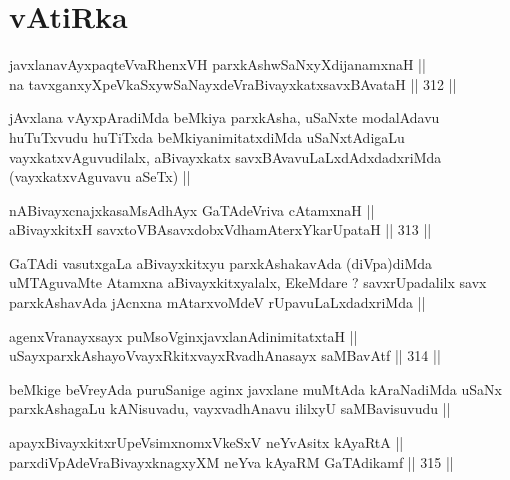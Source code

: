 \section*{vAtiRka}

\begin{shl}
javxlanavAyxpaqteVvaRhenxVH parxkAshwSaNxyXdijanamxnaH || \\
na tavxganxyXpeVkaSxywSaNayxdeVraBivayxkatxsavxBAvataH ||  312 ||  
\end{shl}

\begin{artha}
jAvxlana vAyxpAradiMda beMkiya parxkAsha, uSaNxte modalAdavu
huTuTxvudu huTiTxda beMkiyanimitatxdiMda uSaNxtAdigaLu
vayxkatxvAguvudilalx, aBivayxkatx savxBAvavuLaLxdAdxdadxriMda
(vayxkatxvAguvavu aSeTx) ||
\end{artha}

\begin{shl}
nABivayxcnajxkasaMsAdhAyx GaTAdeVriva cA\s \s tamxnaH || \\
aBivayxkitxH savxtoVBAsavxdobxVdhamAterxYkarUpataH ||  313 ||  
\end{shl}

\begin{artha}
GaTAdi vasutxgaLa aBivayxkitxyu parxkAshakavAda (diVpa)diMda
uMTAguvaMte Atamxna aBivayxkitxyalalx, EkeMdare ? savxrUpadalilx savx
parxkAshavAda jAcnxna mAtarxvoMdeV rUpavuLaLxdadxriMda ||
\end{artha}


\begin{shl}
agenxVranayxsayx puMsoV\s ginxjavxlanAdinimitatxtaH ||  \\
uSayxparxkAshayoVvayxRkitxvayxRvadhAnasayx saMBavAtf ||  314 ||  
\end{shl}

\begin{artha}
beMkige beVreyAda puruSanige aginx javxlane muMtAda kAraNadiMda uSaNx
parxkAshagaLu kANisuvadu, vayxvadhAnavu ililxyU saMBavisuvudu ||
\end{artha}

\begin{shl}
apayxBivayxkitxrUpeV\s simxnomxVkeSxV neYvAsitx kAyaRtA || \\
parxdiVpAdeVraBivayxknagxyXM neYva kAyaRM GaTAdikamf ||  315 ||  
\end{shl}

